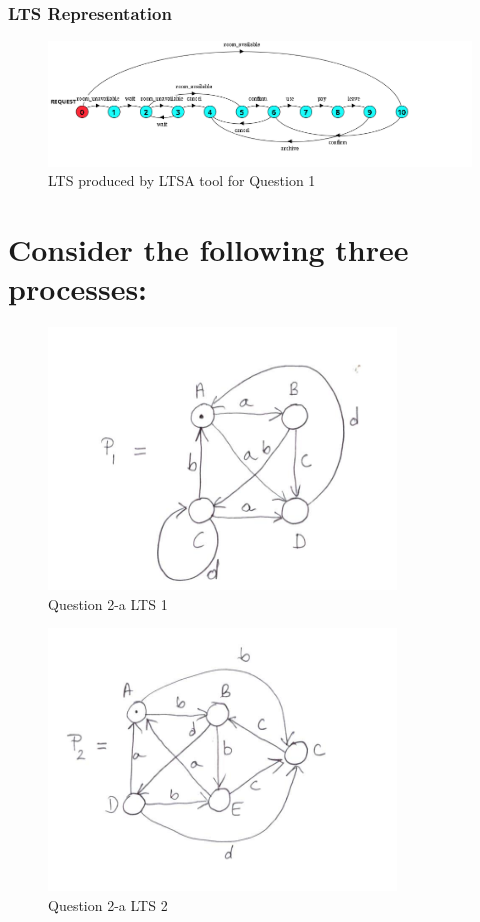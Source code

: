 \documentclass{article}[8pt]
\renewcommand{\thesubsubsection}{\thesection.\alph{subsection}.\Roman{subsubsection}}
\begin{document}
\subsubsection[~\thesubsubsection]{LTS Representation}

\begin{figure}[H]
	\includegraphics[width=\linewidth]{./imgs/Question-1.png}
	\caption{LTS produced by LTSA tool for Question 1}
	\label{fig:Question-1-LTS}
\end{figure}

\section[Question ~\thesection]{Consider the following three processes:}

\begin{figure}[H]
	\includegraphics{./imgs/Question-2-a-i.png}
	\caption{Question 2-a LTS 1}
	\label{fig:Question-2-a-i-LTS}
\end{figure}

\begin{figure}[H]
	\includegraphics{./imgs/Question-2-a-ii.png}
	\caption{Question 2-a LTS 2}
	\label{fig:Question-2-a-ii-LTS}
\end{figure}
\end{document}
